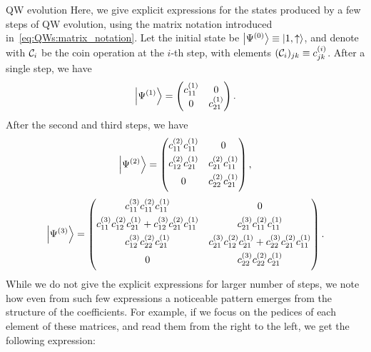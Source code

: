 \begin{examplebox}[label={ex:QWs:bimatrix_notation}]{QW evolution}
\fontsize{10pt}{10pt}\selectfont
    Here, we give explicit expressions for the states produced by a few steps of \ac{QW} evolution, using the matrix notation introduced in~\cref{eq:QWs:matrix_notation}. Let the initial state be $\ket{\Psi^{(0)}}\equiv\ket{1,\uparrow}$, and denote with ${\mathcal{C}}_i$ be the coin operation at the $i$-th step, with elements $({\mathcal{C}}_i)_{jk}\equiv c^{(i)}_{jk}$.
    After a single step, we have
    \begin{equation}
        \ket{\Psi^{(1)}} =
        \begin{pmatrix}
            c^{(1)}_{11} & 0 \\
            0 & c^{(1)}_{21}
        \end{pmatrix}.
    \end{equation}
    After the second and third steps, we have
    \begin{equation}
        \ket{\Psi^{(2)}} =
        \begin{pmatrix}
            c^{(2)}_{11} c^{(1)}_{11} & 0 \\[0.4em]
            c^{(2)}_{12} c^{(1)}_{21} & c^{(2)}_{21} c^{(1)}_{11} \\[0.4em]
            0 & c^{(2)}_{22} c^{(1)}_{21} \\[0.4em]
        \end{pmatrix},
    \end{equation}
    \begin{equation}
        \ket{\Psi^{(3)}} =
        \begin{pmatrix}
            c^{(3)}_{11} c^{(2)}_{11} c^{(1)}_{11} & 0 \\[0.4em]
            c^{(3)}_{11} c^{(2)}_{12} c^{(1)}_{21} +
            c^{(3)}_{12} c^{(2)}_{21} c^{(1)}_{11} &
            c^{(3)}_{21} c^{(2)}_{11} c^{(1)}_{11} \\[0.4em]
            c^{(3)}_{12} c^{(2)}_{22} c^{(1)}_{21} &
            c^{(3)}_{21} c^{(2)}_{12} c^{(1)}_{21} +
            c^{(3)}_{22} c^{(2)}_{21} c^{(1)}_{11} \\[0.4em]
            0 & c^{(3)}_{22} c^{(2)}_{22} c^{(1)}_{21} \\[0.4em]
        \end{pmatrix}.
    \end{equation}
    While we do not give the explicit expressions for larger number of steps, we note how even from such few expressions a noticeable pattern emerges from the structure of the coefficients. For example, if we focus on the pedices of each element of these matrices, and read them from the right to the left, we get the following expression:

\end{examplebox}
